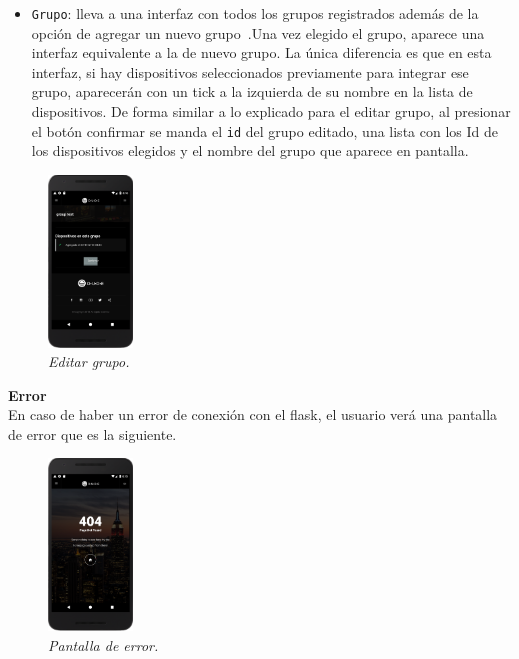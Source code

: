 \begin{itemize}
  \item \lstinline[columns=fixed]{Grupo}: lleva a una interfaz con todos los grupos registrados además de la opción de agregar un nuevo grupo~.Una vez elegido el grupo, aparece una interfaz equivalente a la de nuevo grupo. La única diferencia es que en esta interfaz, si hay dispositivos seleccionados previamente para integrar ese grupo, aparecerán con un tick a la izquierda de su nombre en la lista de dispositivos. De forma similar a lo explicado para el editar grupo, al presionar el botón confirmar se manda el \lstinline[columns=fixed]{id} del grupo editado, una lista con los Id de los dispositivos elegidos y el nombre del grupo que aparece en pantalla.~
\end{itemize}

\begin{figure}[H]
  \centering
  \includegraphics[width=0.2\textwidth, keepaspectratio]{images/app-movil-edit-group}
  \caption{\textit{Editar grupo.}}
  \label{fig:app-movil-edit-group}
\end{figure}

\textbf{Error}\\
En caso de haber un error de conexión con el flask, el usuario verá una pantalla de error que es la siguiente. ~

\begin{figure}[H]
  \centering
  \includegraphics[width=0.2\textwidth, keepaspectratio]{images/app-movil-error}
  \caption{\textit{Pantalla de error.}}
  \label{fig:app-movil-error}
\end{figure}

